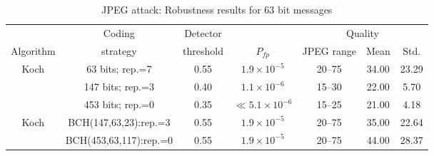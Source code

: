 \documentclass[12pt]{report}
\begin{document}
\begin{table}[!ht]
\tiny
        \begin{center}
                \begin{tabular}{|c|c|c|c|c|c|c|} \hline
				&Coding		 & Detector	&		& \multicolumn{3}{c|}{Quality}			\\ \cline{5-7}
                Algorithm       & strategy       & threshold    & $P_{fp}$      & JPEG range 			& Mean &Std. \\\hline\hline
                Koch 	& 63 bits; rep.=7       & 0.55                             & $1.9\times 10^{-5}$   & 20--75       & 34.00    & 23.29    \\ \cline{2-7}
                	& 147 bits; rep.=3      & 0.40                             & $1.1\times 10^{-6}$   & 15--30       & 22.00    & 5.70    \\ \cline{2-7}
                	& 453 bits; rep.=0      & 0.35                             & $\ll5.1\times 10^{-6}$& 15--25       & 21.00    & 4.18    \\ \hline\hline

                Koch 	& BCH(147,63,23):rep.=3 & 0.55     & $1.9\times 10^{-5}$   & 20--75        & 35.00    & 22.64    \\ \cline{2-7}
                	& BCH(453,63,117):rep.=0& 0.55     & $1.9\times 10^{-5}$   & 20--75        & 44.00    & 28.37    \\ \hline
        \end{tabular}
        \caption{JPEG attack: Robustness results for 63 bit messages}
        \label{tab:GaussRobRes63DMLBK32_63_148}
        \end{center}
\end{table}
\normalsize
\end{document}
